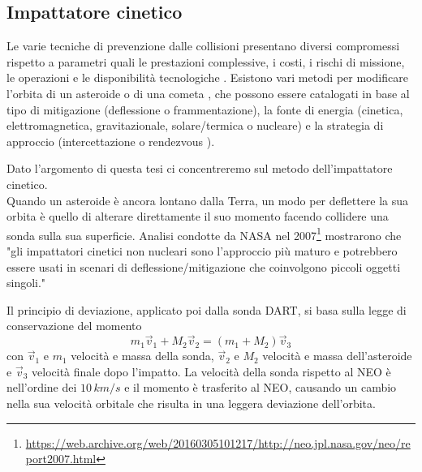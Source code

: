 \subsection{Impattatore cinetico}
Le varie tecniche di prevenzione dalle collisioni presentano diversi compromessi rispetto a parametri quali le prestazioni complessive, i costi, i rischi di missione, le operazioni e le disponibilità tecnologiche \citep{canavan_interception_1992}. Esistono vari metodi per modificare l'orbita di un asteroide o di una cometa \citep{hall_ross_1997}, che possono essere catalogati in base al tipo di mitigazione (deflessione o frammentazione), la fonte di energia (cinetica, elettromagnetica, gravitazionale, solare/termica o nucleare) e la strategia di approccio (intercettazione o rendezvous \citep{solem_interception_1993}).

Dato l'argomento di questa tesi ci concentreremo sul metodo dell'impattatore cinetico.\\
Quando un asteroide è ancora lontano dalla Terra, un modo per deflettere la sua orbita è quello di alterare direttamente il suo momento facendo collidere una sonda sulla sua superficie. Analisi condotte da NASA nel 2007\footnote{\href{https://web.archive.org/web/20160305101217/http://neo.jpl.nasa.gov/neo/report2007.html}{https://web.archive.org/web/20160305101217/http://neo.jpl.nasa.gov/neo/report2007.html}} mostrarono che "gli impattatori cinetici non nucleari sono l'approccio più maturo e potrebbero essere usati in scenari di deflessione/mitigazione che coinvolgono piccoli oggetti singoli."

Il principio di deviazione, applicato poi dalla sonda DART, si basa sulla legge di conservazione del momento
\begin{equation}
    m_1 \vec{v}_1 + M_2\vec{v}_2 = (m_1+M_2)\vec{v}_3
\end{equation}
con $\vec{v}_1$ e $m_1$ velocità e massa della sonda, $\vec{v}_2$ e $M_2$ velocità e massa dell'asteroide e $\vec{v}_3$ velocità finale dopo l'impatto. 
La velocità della sonda rispetto al NEO è nell'ordine dei $10\,km/s$ e il momento è trasferito al NEO, causando un cambio nella sua velocità orbitale che risulta in una leggera deviazione dell'orbita.

